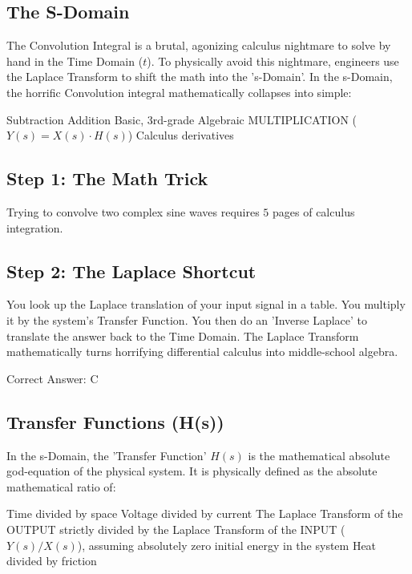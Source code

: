 \subsection{The S-Domain}

The Convolution Integral is a brutal, agonizing calculus nightmare to solve by hand in the Time Domain ($t$). To physically avoid this nightmare, engineers use the Laplace Transform to shift the math into the 's-Domain'. In the s-Domain, the horrific Convolution integral mathematically collapses into simple:

\begin{choices}
    \choice Subtraction
    \choice Addition
    \correctchoice Basic, 3rd-grade Algebraic MULTIPLICATION ($Y(s) = X(s) \cdot H(s)$)
    \choice Calculus derivatives
\end{choices}

\begin{solution}

\subsection*{Step 1: The Math Trick}
Trying to convolve two complex sine waves requires $5$ pages of calculus integration.

\subsection*{Step 2: The Laplace Shortcut}
You look up the Laplace translation of your input signal in a table. You multiply it by the system's Transfer Function. You then do an 'Inverse Laplace' to translate the answer back to the Time Domain. The Laplace Transform mathematically turns horrifying differential calculus into middle-school algebra.

Correct Answer: C
\end{solution}

\clearpage

\subsection{Transfer Functions (H(s))}

In the s-Domain, the 'Transfer Function' $H(s)$ is the mathematical absolute god-equation of the physical system. It is physically defined as the absolute mathematical ratio of:

\begin{choices}
    \choice Time divided by space
    \choice Voltage divided by current
    \correctchoice The Laplace Transform of the OUTPUT strictly divided by the Laplace Transform of the INPUT ($Y(s) / X(s)$), assuming absolutely zero initial energy in the system
    \choice Heat divided by friction
\end{choices}

